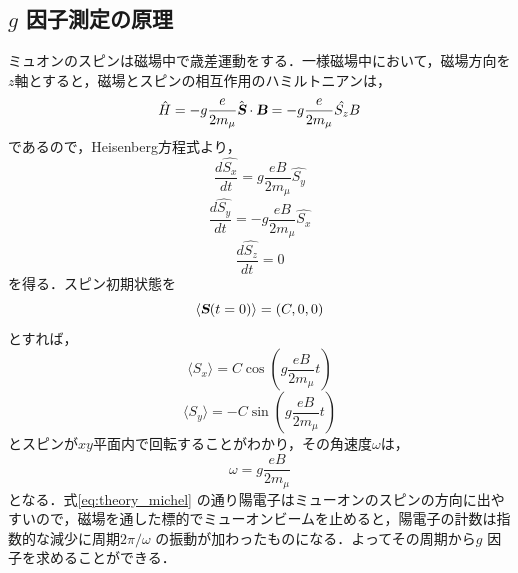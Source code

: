 \subsection{$g$ 因子測定の原理}
ミュオンのスピンは磁場中で歳差運動をする．一様磁場中において，磁場方向を$z$軸とすると，磁場とスピンの相互作用のハミルトニアンは，
\begin{equation}
\hat{H} = - g \frac{e}{2m_\mu} \hat {\textsl{\textbf {S}}} \cdot \textsl{\textbf {B}} = - g \frac{e}{2m_\mu}  \hat{S_z} B
\end{equation} 
であるので，Heisenberg方程式より，
\begin{equation}
\frac{d\hat{S_x}}{dt} =  g \frac{eB}{2m_\mu}\hat{S_y} 
\end{equation} 
\begin{equation}
\frac{d\hat{S_y}}{dt} = - g \frac{eB}{2m_\mu}\hat{S_x} 
\end{equation} 
\begin{equation}
\frac{d\hat{S_z}}{dt} = 0 
\end{equation} 
を得る．スピン初期状態を
\begin{equation}
\langle \textsl{\textbf {S}}(t=0)\rangle = (C,0,0)
\end{equation} 
とすれば，
\begin{equation}
\langle S_x \rangle= C\cos{(g\frac{eB}{2m_\mu}t)}
\end{equation}
\begin{equation}
\langle S_y \rangle= -C\sin{(g\frac{eB}{2m_\mu}t)}
\end{equation}
とスピンが$xy$平面内で回転することがわかり，その角速度$\omega$は，
\begin{equation}
\omega = g\frac{eB}{2m_\mu}
\end{equation}
となる．式\eqref{eq:theory_michel} の通り陽電子はミューオンのスピンの方向に出やすいので，磁場を通した標的でミューオンビームを止めると，陽電子の計数は指数的な減少に周期$2\pi / \omega$ の振動が加わったものになる．よってその周期から$g$ 因子を求めることができる．

